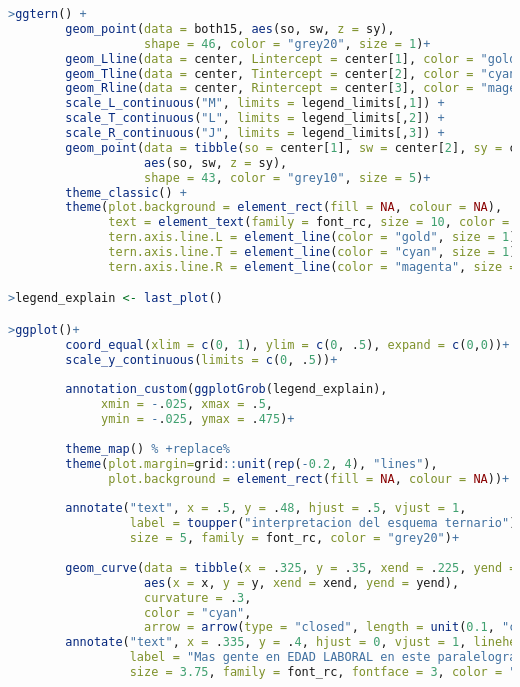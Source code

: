 \begin{lstlisting}[language=R, caption=C\'odigo 2 con la construcci\'on del mapa]
>ggtern() +
        geom_point(data = both15, aes(so, sw, z = sy), 
                   shape = 46, color = "grey20", size = 1)+
        geom_Lline(data = center, Lintercept = center[1], color = "gold", size = 1)+
        geom_Tline(data = center, Tintercept = center[2], color = "cyan", size = 1)+
        geom_Rline(data = center, Rintercept = center[3], color = "magenta", size = 1)+
        scale_L_continuous("M", limits = legend_limits[,1]) +
        scale_T_continuous("L", limits = legend_limits[,2]) +
        scale_R_continuous("J", limits = legend_limits[,3]) +
        geom_point(data = tibble(so = center[1], sw = center[2], sy = center[3]), 
                   aes(so, sw, z = sy), 
                   shape = 43, color = "grey10", size = 5)+
        theme_classic() +
        theme(plot.background = element_rect(fill = NA, colour = NA),
              text = element_text(family = font_rc, size = 10, color = "grey20"),
              tern.axis.line.L = element_line(color = "gold", size = 1),
              tern.axis.line.T = element_line(color = "cyan", size = 1),
              tern.axis.line.R = element_line(color = "magenta", size = 1))

>legend_explain <- last_plot()

>ggplot()+
        coord_equal(xlim = c(0, 1), ylim = c(0, .5), expand = c(0,0))+
        scale_y_continuous(limits = c(0, .5))+
        
        annotation_custom(ggplotGrob(legend_explain),
             xmin = -.025, xmax = .5, 
             ymin = -.025, ymax = .475)+
        
        theme_map() % +replace%
        theme(plot.margin=grid::unit(rep(-0.2, 4), "lines"),
              plot.background = element_rect(fill = NA, colour = NA))+
        
        annotate("text", x = .5, y = .48, hjust = .5, vjust = 1,
                 label = toupper("interpretacion del esquema ternario"),
                 size = 5, family = font_rc, color = "grey20")+
        
        geom_curve(data = tibble(x = .325, y = .35, xend = .225, yend = .3), 
                   aes(x = x, y = y, xend = xend, yend = yend),
                   curvature = .3,
                   color = "cyan", 
                   arrow = arrow(type = "closed", length = unit(0.1, "cm")))+
        annotate("text", x = .335, y = .4, hjust = 0, vjust = 1, lineheight = .9,
                 label = "Mas gente en EDAD LABORAL en este paralelogramo,\ncomparado con la media UE; menos ninos y ancianos\n(encima linea azul, debajo lineas rosas y amarillas)",
                 size = 3.75, family = font_rc, fontface = 3, color = "cyan3")+
        

\end{lstlisting}
